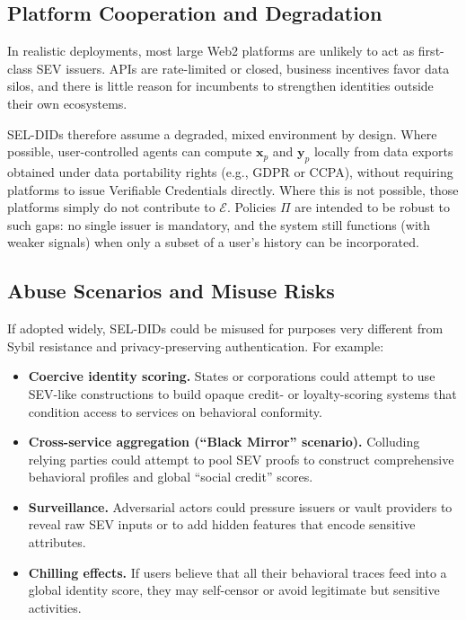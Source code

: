 \documentclass[11pt]{article}
\begin{document}
\subsection{Platform Cooperation and Degradation}

In realistic deployments, most large Web2 platforms are unlikely to act as first-class SEV issuers. APIs are rate-limited or closed, business incentives favor data silos, and there is little reason for incumbents to strengthen identities outside their own ecosystems.

SEL-DIDs therefore assume a degraded, mixed environment by design. Where possible, user-controlled agents can compute $\mathbf{x}_p$ and $\mathbf{y}_p$ locally from data exports obtained under data portability rights (e.g., GDPR or CCPA), without requiring platforms to issue Verifiable Credentials directly. Where this is not possible, those platforms simply do not contribute to $\mathcal{E}$. Policies $\Pi$ are intended to be robust to such gaps: no single issuer is mandatory, and the system still functions (with weaker signals) when only a subset of a user's history can be incorporated.

\subsection{Abuse Scenarios and Misuse Risks}

If adopted widely, SEL-DIDs could be misused for purposes very different from Sybil resistance and privacy-preserving authentication. For example:

\begin{itemize}
  \item \textbf{Coercive identity scoring.} States or corporations could attempt to use SEV-like constructions to build opaque credit- or loyalty-scoring systems that condition access to services on behavioral conformity.
  \item \textbf{Cross-service aggregation (``Black Mirror'' scenario).} Colluding relying parties could attempt to pool SEV proofs to construct comprehensive behavioral profiles and global ``social credit'' scores.
  \item \textbf{Surveillance.} Adversarial actors could pressure issuers or vault providers to reveal raw SEV inputs or to add hidden features that encode sensitive attributes.
  \item \textbf{Chilling effects.} If users believe that all their behavioral traces feed into a global identity score, they may self-censor or avoid legitimate but sensitive activities.
\end{itemize}
\end{document}
